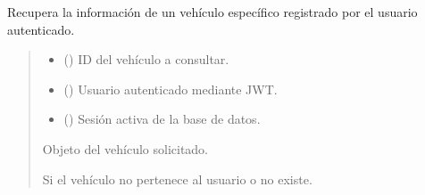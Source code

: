 \documentclass[letterpaper,10pt,spanish]{sphinxmanual}
\begin{document}
\begin{fulllineitems}
\label{\detokenize{modelos:main.obtener_vehiculo}}
\pysigstartsignatures
\pysiglinewithargsret
{}
{\sphinxparamcomma {}\sphinxparamcomma {}}
{}
\pysigstopsignatures
\sphinxAtStartPar
Recupera la información de un vehículo específico registrado por el usuario autenticado.
\begin{quote}\begin{description}
\begin{itemize}
\item {} 
\sphinxAtStartPar
{} () \textendash{} ID del vehículo a consultar.

\item {} 
\sphinxAtStartPar
{} ({\hyperref[\detokenize{modelos:main.Usuario}]{}}) \textendash{} Usuario autenticado mediante JWT.

\item {} 
\sphinxAtStartPar
{} () \textendash{} Sesión activa de la base de datos.

\end{itemize}

\sphinxAtStartPar
Objeto del vehículo solicitado.

\sphinxAtStartPar
{\hyperref[\detokenize{modelos:main.Vehiculo}]{}}

\sphinxAtStartPar
{} \textendash{} Si el vehículo no pertenece al usuario o no existe.

\end{description}\end{quote}

\end{fulllineitems}
\end{document}
